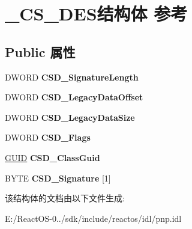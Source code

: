 \hypertarget{struct___c_s___d_e_s}{}\section{\+\_\+\+C\+S\+\_\+\+D\+E\+S结构体 参考}
\label{struct___c_s___d_e_s}
\subsection*{Public 属性}
\begin{DoxyCompactItemize}
\item 
\mbox{\label{struct___c_s___d_e_s_a657825303c4c2900cb3878dc7f8b7f69}} 
D\+W\+O\+RD {\bfseries C\+S\+D\+\_\+\+Signature\+Length}
\item 
\mbox{\label{struct___c_s___d_e_s_a8c895780fa97a32a54a774c47bc568f4}} 
D\+W\+O\+RD {\bfseries C\+S\+D\+\_\+\+Legacy\+Data\+Offset}
\item 
\mbox{\label{struct___c_s___d_e_s_afd163fec20d367bdce4c8ce993172a3a}} 
D\+W\+O\+RD {\bfseries C\+S\+D\+\_\+\+Legacy\+Data\+Size}
\item 
\mbox{\label{struct___c_s___d_e_s_a8f6348fca4a39931d5ca1a251bff21df}} 
D\+W\+O\+RD {\bfseries C\+S\+D\+\_\+\+Flags}
\item 
\mbox{\label{struct___c_s___d_e_s_a7c0b409a45ce62ca3287623c5dbbc102}} 
\hyperlink{interface_g_u_i_d}{G\+U\+ID} {\bfseries C\+S\+D\+\_\+\+Class\+Guid}
\item 
\mbox{\label{struct___c_s___d_e_s_aebdb7a82101a05626306615e418cf29d}} 
B\+Y\+TE {\bfseries C\+S\+D\+\_\+\+Signature} \mbox{[}1\mbox{]}
\end{DoxyCompactItemize}


该结构体的文档由以下文件生成\+:\begin{DoxyCompactItemize}
\item 
E\+:/\+React\+O\+S-\/0../sdk/include/reactos/idl/pnp.\+idl\end{DoxyCompactItemize}
